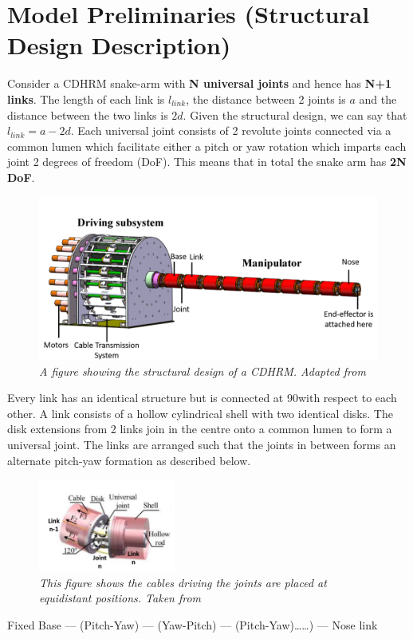 \documentclass[a4paper,12pt]{report}
\begin{document}
\section{Model Preliminaries \normalsize{(Structural Design Description)}}

Consider a CDHRM snake-arm with \textbf{N universal joints} and hence has \textbf{N+1 links}. The length of each link is $l_{link}$, the distance between 2 joints is $a$ and the distance between the two links is $2d$. Given the structural design, we can say that $l_{link}=a-2d$. Each universal joint consists of 2 revolute joints connected via a common lumen which facilitate either a pitch or yaw rotation which imparts each joint 2 degrees of freedom (DoF). This means that in total the snake arm has \textbf{2N DoF}. 
\begin{figure}[h]
	\centering
	\includegraphics[width=\textwidth]{images/CDHRM System.png}
	\caption{\textit{A figure showing the structural design of a CDHRM. Adapted from \cite{RN29}}}
	\label{CDHRM-structure}
\end{figure}

Every link has an identical structure but is connected at 90\textdegree with respect to each other. A link consists of a hollow cylindrical shell with two identical disks. The disk extensions from 2 links join in the centre onto a common lumen to form a universal joint. The links are arranged such that the joints in between forms an alternate pitch-yaw formation as described below.
\begin{figure}
	\centering
	\includegraphics[width=0.4\textwidth]{images/cable_in_case.png}
	\caption{\textit{This figure shows the cables driving the joints are placed at equidistant positions. Taken from \cite{RN30}}}
	\vspace{-40pt}
	\label{cable-pos}
\end{figure}
\begin{center}
	Fixed Base --- (Pitch-Yaw) --- (Yaw-Pitch) --- (Pitch-Yaw)\ldots\ldots) --- Nose link
\end{center} 
\end{document}
